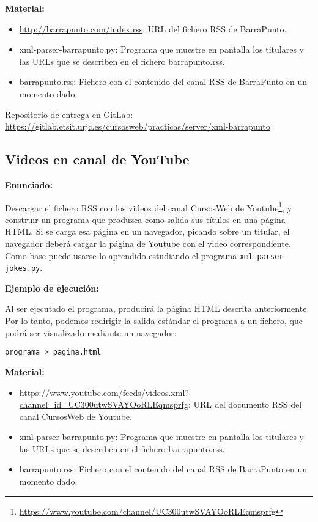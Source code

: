 \textbf{Material:}

\begin{itemize}
\item \url{http://barrapunto.com/index.rss}: URL del fichero RSS de BarraPunto.
\item xml-parser-barrapunto.py: Programa que muestre en pantalla los titulares y las URLs que se describen en el fichero barrapunto.rss.
\item barrapunto.rss: Fichero con el contenido del canal RSS de BarraPunto en un momento dado.
\end{itemize}

Repositorio de entrega en GitLab: \\
\url{https://gitlab.etsit.urjc.es/cursosweb/practicas/server/xml-barrapunto}


\subsection{Videos en canal de YouTube}
\label{subsec:xml-youtube}

\textbf{Enunciado:}

Descargar el fichero RSS con los videos del canal CursosWeb de Youtube\footnote{\url{https://www.youtube.com/channel/UC300utwSVAYOoRLEqmsprfg}}, y construir un programa que produzca como salida sus títulos en una página HTML. Si se carga esa página en un navegador,  picando sobre un titular, el navegador deberá cargar la página de Youtube con el video correspondiente. Como base puede usarse lo aprendido estudiando el programa \verb|xml-parser-jokes.py|.

\textbf{Ejemplo de ejecución:}

Al ser ejecutado el programa, producirá la página HTML descrita anteriormente. Por lo tanto, podemos redirigir la salida estándar el programa a un fichero, que podrá ser visualizado mediante un navegador:

\begin{verbatim}
programa > pagina.html
\end{verbatim}

\textbf{Material:}

\begin{itemize}
\item \url{https://www.youtube.com/feeds/videos.xml?channel_id=UC300utwSVAYOoRLEqmsprfg}: URL del documento RSS del canal CursosWeb de Youtube.
\item xml-parser-barrapunto.py: Programa que muestre en pantalla los titulares y las URLs que se describen en el fichero barrapunto.rss.
\item barrapunto.rss: Fichero con el contenido del canal RSS de BarraPunto en un momento dado.
\end{itemize}

